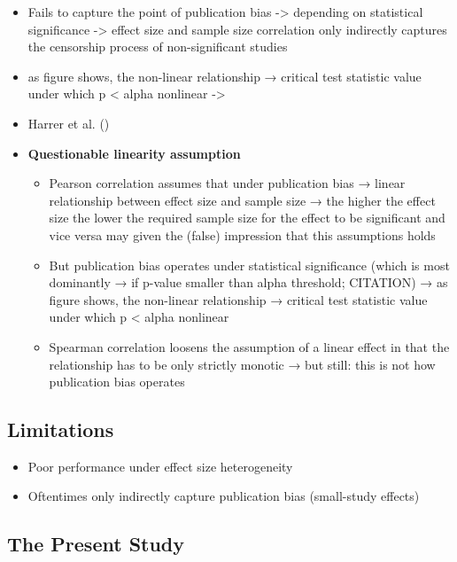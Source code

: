 \documentclass[
  12pt,
]{scrartcl}
\providecommand{\tightlist}{%
  \setlength{\itemsep}{0pt}\setlength{\parskip}{0pt}}\usepackage{longtable,booktabs,array}
\begin{document}
\begin{itemize}
\item
  Fails to capture the point of publication bias -\textgreater{}
  depending on statistical significance -\textgreater{} effect size and
  sample size correlation only indirectly captures the censorship
  process of non-significant studies
\item
  as figure shows, the non-linear relationship → critical test statistic
  value under which p \textless{} alpha nonlinear -\textgreater{}
\item
  Harrer et al. ()
\item
  \textbf{Questionable linearity assumption}

  \begin{itemize}
  \item
    Pearson correlation assumes that under publication bias → linear
    relationship between effect size and sample size → the higher the
    effect size the lower the required sample size for the effect to be
    significant and vice versa may given the (false) impression that
    this assumptions holds
  \item
    But publication bias operates under statistical significance (which
    is most dominantly → if p-value smaller than alpha threshold;
    CITATION) → as figure shows, the non-linear relationship → critical
    test statistic value under which p \textless{} alpha nonlinear
  \item
    Spearman correlation loosens the assumption of a linear effect in
    that the relationship has to be only strictly monotic → but still:
    this is not how publication bias operates
  \end{itemize}
\end{itemize}

\subsection{Limitations}\label{limitations}

\begin{itemize}
\tightlist
\item
  Poor performance under effect size heterogeneity
\item
  Oftentimes only indirectly capture publication bias (small-study
  effects)
\end{itemize}

\subsection{The Present Study}\label{the-present-study}
\end{document}
